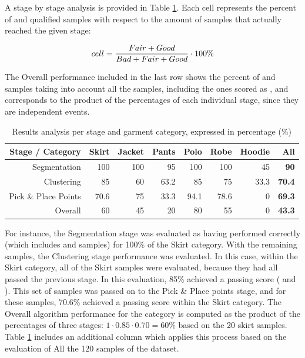 
A stage by stage analysis is provided in Table \ref{table:table2}. Each cell represents the percent of \good{} and \great{} qualified samples with respect to the amount of samples that actually reached the given stage:

\begin{equation}
cell = \frac{Fair + Good}{Bad + Fair + Good} \cdot 100 \%
\end{equation}

The Overall performance included in the last row shows the percent of \good{} and \great{} samples taking into account all the samples, including the ones scored as \discarded{}, and corresponds to the product of the percentages of each individual stage, since they are independent events.

\begin{table}[htbp]
\centering
\begin{tabular}{|r||r|r|r|r|r|r||r|}
\hline
	Stage \slash{} Category & Skirt & Jacket & Pants & Polo & Robe & Hoodie & All \\
\hline\hline
   Segmentation         & 100   & 100 &  95   & 100   & 100   & 45   & \textbf{90}\\
   Clustering           &  85   &  60 &  63.2 &  85   &  75   & 33.3 & \textbf{70.4}\\
   Pick \& Place Points &  70.6 &  75 &  33.3 &  94.1 &  78.6 &  0   & \textbf{69.3}\\
   \hline\hline
   Overall              &  60   &  45 &  20   &  80   &    55 &  0   & \textbf{43.3} \\ 
\hline
\end{tabular}
\caption{Results analysis per stage and garment category, expressed in percentage (\%)}
\label{table:table2}
\end{table}

For instance, the Segmentation stage was evaluated as having performed correctly (which includes \good{} and \great{} samples) for 100\% of the Skirt category. With the remaining samples, the Clustering stage performance was evaluated. In this case, within the Skirt category, all of the Skirt samples were evaluated, because they had all passed the previous stage. In this evaluation, 85\% achieved a passing score (\good{} and \great{}). This set of samples was passed on to the Pick \& Place points stage, and for these samples, 70.6\% achieved a passing score within the Skirt category. The Overall algorithm performance for the category is computed as the product of the percentages of three stages: $1 \cdot 0.85 \cdot 0.70 = 60\%$ based on the 20 skirt samples. Table \ref{table:table2} includes an additional column which applies this process based on the evaluation of All the 120 samples of the dataset.

